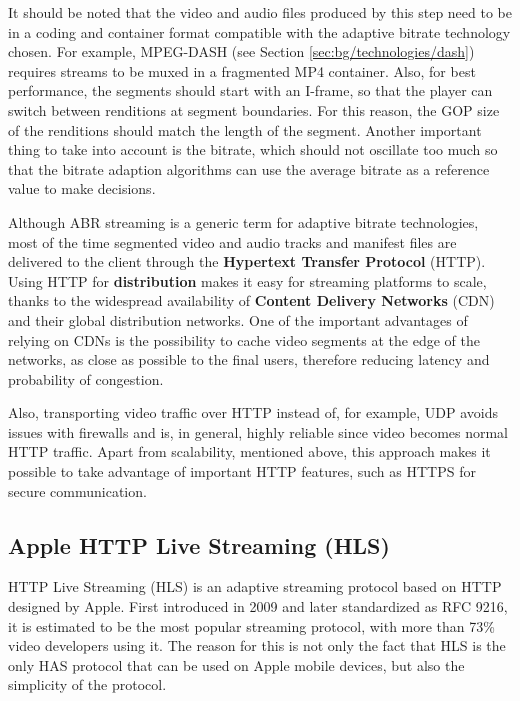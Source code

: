It should be noted that the video and audio files produced by this step need to be in a coding and container format compatible with the adaptive bitrate technology chosen. For example, MPEG-DASH (see Section \ref{sec:bg/technologies/dash}) requires streams to be muxed in a fragmented MP4 container. Also, for best performance, the segments should start with an I-frame, so that the player can switch between renditions at segment boundaries. For this reason, the GOP size of the renditions should match the length of the segment. Another important thing to take into account is the bitrate, which should not oscillate too much so that the bitrate adaption algorithms can use the average bitrate as a reference value to make decisions.\cite{ozer}

Although ABR streaming is a generic term for adaptive bitrate technologies, most of the time segmented video and audio tracks and manifest files are delivered to the client through the \textbf{Hypertext Transfer Protocol} (HTTP). Using HTTP for \textbf{distribution} makes it easy for streaming platforms to scale, thanks to the widespread availability of \textbf{Content Delivery Networks} (CDN) and their global distribution networks. One of the important advantages of relying on CDNs is the possibility to cache video segments at the edge of the networks, as close as possible to the final users, therefore reducing latency and probability of congestion.

Also, transporting video traffic over HTTP instead of, for example, UDP avoids issues with firewalls and is, in general, highly reliable since video becomes normal HTTP traffic. Apart from scalability, mentioned above, this approach makes it possible to take advantage of important HTTP features, such as HTTPS for secure communication.

\subsection{Apple HTTP Live Streaming (HLS)}
\label{sec:bg/abr/hls}

HTTP Live Streaming (HLS) is an adaptive streaming protocol based on HTTP designed by Apple. First introduced in 2009 and later standardized as RFC 9216, it is estimated to be the most popular streaming protocol, with more than 73\% video developers using it.\cite{rfc8216}\cite{bitmovin} The reason for this is not only the fact that HLS is the only HAS protocol that can be used on Apple mobile devices, but also the simplicity of the protocol.


